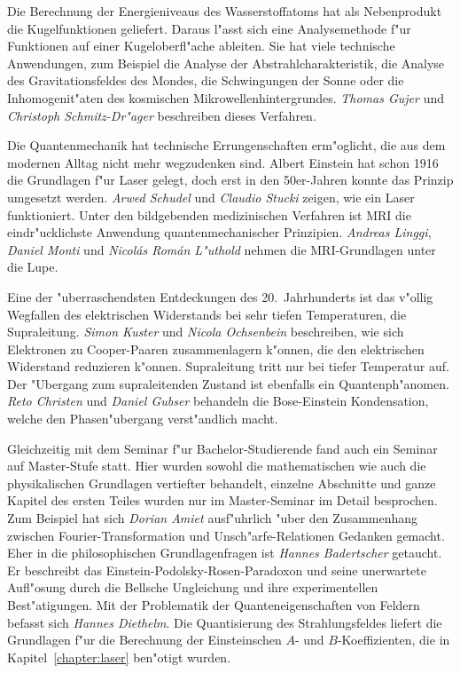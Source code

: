 Die Berechnung der Energieniveaus des Wasserstoffatoms hat als
Nebenprodukt die Kugelfunktionen geliefert.
Daraus l"asst sich eine Analysemethode f"ur Funktionen auf einer
Kugeloberfl"ache ableiten.
Sie hat viele technische Anwendungen, zum Beispiel die Analyse der
Abstrahlcharakteristik, die Analyse des Gravitationsfeldes des
Mondes, die Schwingungen der Sonne oder die Inhomogenit"aten des
kosmischen Mikrowellenhintergrundes.
{\em Thomas Gujer} und {\em Christoph Schmitz-Dr"ager} beschreiben
dieses Verfahren.

Die Quantenmechanik hat technische Errungenschaften erm"oglicht, die
aus dem modernen Alltag nicht mehr wegzudenken sind.
Albert Einstein hat schon 1916 die Grundlagen f"ur Laser gelegt,
doch erst in den 50er-Jahren konnte das Prinzip umgesetzt werden.
{\em Arwed Schudel} und {\em Claudio Stucki} zeigen, wie ein Laser funktioniert.
Unter den bildgebenden medizinischen Verfahren ist MRI die eindr"ucklichste
Anwendung quantenmechanischer Prinzipien.
{\em Andreas Linggi}, {\em Daniel Monti} und {\em Nicol\'as Rom\'an L"uthold}
nehmen die MRI-Grundlagen unter die Lupe.

Eine der "uberraschendsten Entdeckungen des 20.~Jahrhunderts ist das
v"ollig Wegfallen des elektrischen Widerstands bei sehr tiefen 
Temperaturen, die Supraleitung.
{\em Simon Kuster} und {\em Nicola Ochsenbein} beschreiben, wie sich
Elektronen zu Cooper-Paaren zusammenlagern k"onnen, die
den elektrischen Widerstand reduzieren k"onnen.
Supraleitung tritt nur bei tiefer Temperatur auf.
Der "Ubergang zum supraleitenden Zustand ist ebenfalls ein Quantenph"anomen.
{\em Reto Christen} und {\em Daniel Gubser} behandeln die Bose-Einstein
Kondensation, welche den Phasen"ubergang verst"andlich macht.

Gleichzeitig mit dem Seminar f"ur Bachelor-Studierende fand auch ein
Seminar auf Master-Stufe statt.
Hier wurden sowohl die mathematischen wie auch die physikalischen Grundlagen
vertiefter behandelt, einzelne Abschnitte und ganze Kapitel des ersten
Teiles wurden nur im Master-Seminar im Detail besprochen.
Zum Beispiel hat sich {\em Dorian Amiet} ausf"uhrlich
"uber den Zusammenhang zwischen Fourier-Transformation und 
Unsch"arfe-Relationen Gedanken gemacht.
Eher in die philosophischen Grundlagenfragen ist {\em Hannes Badertscher}
getaucht. Er beschreibt das Einstein-Podolsky-Rosen-Paradoxon und seine
unerwartete Aufl"osung durch die Bellsche Ungleichung und ihre experimentellen
Best"atigungen.
Mit der Problematik der Quanteneigenschaften von Feldern befasst sich
{\em Hannes Diethelm}. 
Die Quantisierung des Strahlungsfeldes liefert die Grundlagen f"ur die
Berechnung der Einsteinschen $A$- und $B$-Koeffizienten, die in 
Kapitel~\ref{chapter:laser} ben"otigt wurden.

